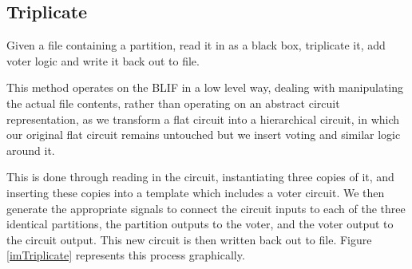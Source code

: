 \documentclass[12pt,final,oneside,a4paper]{dwThesis} %
\begin{document}
\newpage

   \subsection{Triplicate}
   \label{algTriplicate} Given a file containing a
   partition, read it in as a black box, triplicate it, add voter logic and
   write it back out to file.

   This method operates on the \gls{BLIF} in a low level way, dealing with
   manipulating the actual file contents, rather than operating on an abstract
   circuit representation, as we transform a flat circuit into a hierarchical
   circuit, in which our original flat circuit remains untouched but we insert
   voting and similar logic around it.
   
   This is done through reading in the circuit, instantiating three copies of it,
   and inserting these copies into a template which includes a voter circuit.
   We then generate the appropriate signals to connect the circuit inputs to each of the three identical partitions, the partition outputs to the voter,
   and the voter output to the circuit output.
   This new circuit is then written back out to file.
   Figure \ref{imTriplicate} represents this process graphically.
\end{document}
